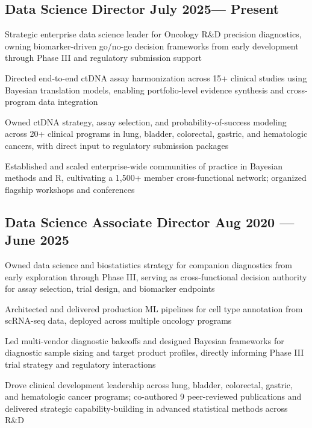 \subsection{{Data Science Director \hfill July 2025--- Present}}
\begin{zitemize}
    \item Strategic enterprise data science leader for Oncology R\&D precision diagnostics, owning biomarker-driven go/no-go decision frameworks from early development through Phase III and regulatory submission support
    \item Directed end-to-end ctDNA assay harmonization across 15+ clinical studies using Bayesian translation models, enabling portfolio-level evidence synthesis and cross-program data integration
    \item Owned ctDNA strategy, assay selection, and probability-of-success modeling across 20+ clinical programs in lung, bladder, colorectal, gastric, and hematologic cancers, with direct input to regulatory submission packages
    \item Established and scaled enterprise-wide communities of practice in Bayesian methods and R, cultivating a 1,500+ member cross-functional network; organized flagship workshops and conferences
\end{zitemize}

\subsection{{Data Science Associate Director \hfill Aug 2020 --- June 2025}}
\begin{zitemize}
    \item Owned data science and biostatistics strategy for companion diagnostics from early exploration through Phase III, serving as cross-functional decision authority for assay selection, trial design, and biomarker endpoints
    \item Architected and delivered production ML pipelines for cell type annotation from scRNA-seq data, deployed across multiple oncology programs
    \item Led multi-vendor diagnostic bakeoffs and designed Bayesian frameworks for diagnostic sample sizing and target product profiles, directly informing Phase III trial strategy and regulatory interactions
    \item Drove clinical development leadership across lung, bladder, colorectal, gastric, and hematologic cancer programs; co-authored 9 peer-reviewed publications and delivered strategic capability-building in advanced statistical methods across R\&D
\end{zitemize}

